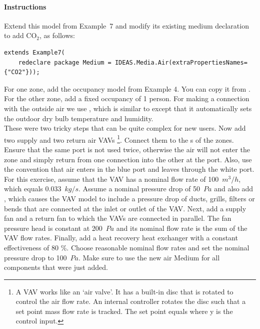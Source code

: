 \documentclass[10pt,a4paper]{article}
\begin{document}
\paragraph{Instructions}
Extend this model from Example~7 and modify its existing medium declaration
to add CO$_2$, as follows:
\begin{verbatim}
extends Example7(
    redeclare package Medium = IDEAS.Media.Air(extraPropertiesNames={"CO2"}));
\end{verbatim}
For one zone, add the occupancy model from Example 4. 
You can copy it from .
For the other zone, add a fixed occupancy of 1 person. For making a connection with the outside air we use ,
which is similar to  except that it 
automatically sets the outdoor dry bulb temperature and humidity. \\

These were two tricky steps that can be quite complex for new users. 
Now add two supply and two return air VAVs
\footnote{A VAV works like an `air valve'. It has a built-in disc that is rotated to control the 
air flow rate. An internal controller rotates the disc such that a set point mass flow rate is tracked.
The set point equals  where y is the control input.}.
Connect them to the s of the zones. 
Ensure that the same port is not used twice, otherwise
the air will not enter the zone and simply return from one 
connection into the other at the port.
Also, use the convention that air enters in the blue port and leaves
through the white port.
For this exercise, assume that the VAV has a nominal flow rate of 100~$m^3/h$,
which equals 0.033~$kg/s$.
Assume a nominal pressure drop of 50~$Pa$ and
also add , which causes the VAV
model to include a pressure drop of ducts, grills, filters or bends that are connected
at the inlet or outlet of the VAV. Next, add a supply fan and a return fan to which the VAVs
are connected in parallel. The fan pressure head is constant at 200~$Pa$
and its nominal flow rate is the sum of the VAV flow rates.
Finally, add a heat recovery heat exchanger with a constant effectiveness of 80 \%.
Choose reasonable nominal flow rates and set the nominal pressure drop to 100~$Pa$.
Make sure to use the new air Medium for all components that were just added.\\
\end{document}
